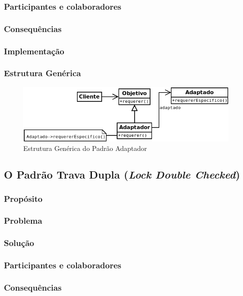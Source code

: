 \subsubsection{Participantes e colaboradores}
\subsubsection{Consequências}
\subsubsection{Implementação}
\subsubsection{Estrutura Genérica}

\begin{figure}[h]
\begin{center}
\includegraphics[scale=0.6]{adaptador.png}
\caption{Estrutura Genérica do Padrão Adaptador}\label{fig:adaptador}
\end{center}
\end{figure}

\subsection{O Padrão Trava Dupla (\textit{Lock Double Checked})}
\subsubsection{Propósito}
\subsubsection{Problema}
\subsubsection{Solução}
\subsubsection{Participantes e colaboradores}
\subsubsection{Consequências}
